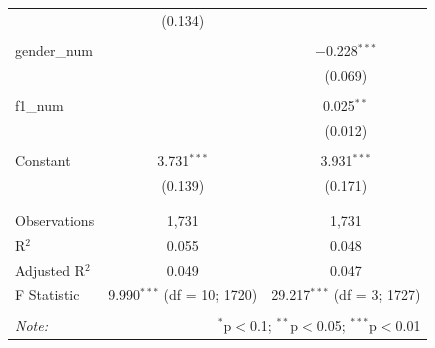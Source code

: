 \documentclass[xcolor=table]{beamer}
\begin{document}
\begin{frame}
\begin{table}[!htbp]
{\begin{tabular}{@{\extracolsep{5pt}}lcc}
  & (0.134) &  \\ 
  & & \\ 
 gender\_num &  & $-$0.228$^{***}$ \\ 
  &  & (0.069) \\ 
  & & \\ 
 f1\_num &  & 0.025$^{**}$ \\ 
  &  & (0.012) \\ 
  & & \\ 
 Constant & 3.731$^{***}$ & 3.931$^{***}$ \\ 
  & (0.139) & (0.171) \\ 
  & & \\ 
\hline \\[-1.8ex] 
Observations & 1,731 & 1,731 \\ 
R$^{2}$ & 0.055 & 0.048 \\ 
Adjusted R$^{2}$ & 0.049 & 0.047 \\ 
F Statistic & 9.990$^{***}$ (df = 10; 1720) & 29.217$^{***}$ (df = 3; 1727) \\ 
\hline 
\hline \\[-1.8ex] 
\textit{Note:}  & \multicolumn{2}{r}{$^{*}$p$<$0.1; $^{**}$p$<$0.05; $^{***}$p$<$0.01} \\ 
\end{tabular}
}
\end{table}
\end{frame}
\end{document}
